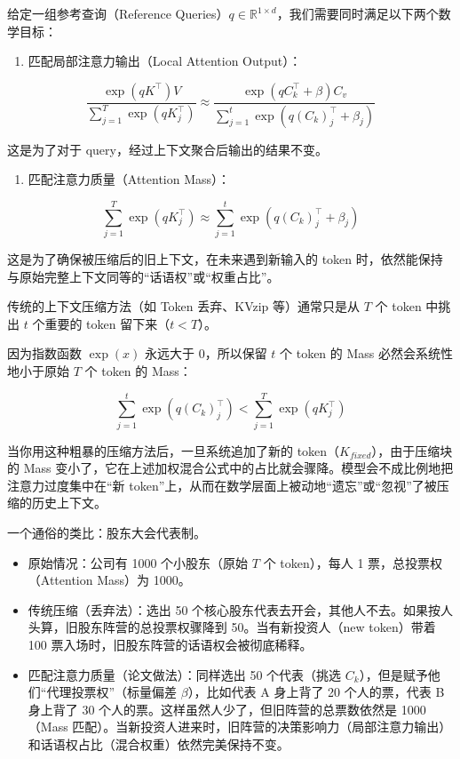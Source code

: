 给定一组参考查询（Reference Queries）\(q \in \mathbb{R}^{1 \times d}\)，我们需要同时满足以下两个数学目标：

\begin{enumerate}
\def\labelenumi{\arabic{enumi}.}
\tightlist
\item
  匹配局部注意力输出（Local Attention Output）：
\end{enumerate}

\[
\frac{\exp(qK^\top)V}{\sum_{j=1}^{T}\exp(qK_j^\top)}
\approx
\frac{\exp(qC_k^\top+\beta)C_v}{\sum_{j=1}^{t}\exp(q(C_k)_j^\top+\beta_j)}
\]

这是为了对于 query，经过上下文聚合后输出的结果不变。

\begin{enumerate}
\def\labelenumi{\arabic{enumi}.}
\setcounter{enumi}{1}
\tightlist
\item
  匹配注意力质量（Attention Mass）：
\end{enumerate}

\[
\sum_{j=1}^{T}\exp(qK_j^\top)
\approx
\sum_{j=1}^{t}\exp(q(C_k)_j^\top+\beta_j)
\]

这是为了确保被压缩后的旧上下文，在未来遇到新输入的 token 时，依然能保持与原始完整上下文同等的``话语权''或``权重占比''。

传统的上下文压缩方法（如 Token 丢弃、KVzip 等）通常只是从 \(T\) 个 token 中挑出 \(t\) 个重要的 token 留下来（\(t<T\)）。

因为指数函数 \(\exp(x)\) 永远大于 0，所以保留 \(t\) 个 token 的 Mass 必然会系统性地小于原始 \(T\) 个 token 的 Mass：

\[
\sum_{j=1}^{t}\exp(q(C_k)_j^\top)
<
\sum_{j=1}^{T}\exp(qK_j^\top)
\]

当你用这种粗暴的压缩方法后，一旦系统追加了新的 token（\(K_{fixed}\)），由于压缩块的 Mass 变小了，它在上述加权混合公式中的占比就会骤降。模型会不成比例地把注意力过度集中在``新 token''上，从而在数学层面上被动地``遗忘''或``忽视''了被压缩的历史上下文。

一个通俗的类比：股东大会代表制。

\begin{itemize}
\tightlist
\item
  原始情况：公司有 1000 个小股东（原始 \(T\) 个 token），每人 1 票，总投票权（Attention Mass）为 1000。
\item
  传统压缩（丢弃法）：选出 50 个核心股东代表去开会，其他人不去。如果按人头算，旧股东阵营的总投票权骤降到 50。当有新投资人（new token）带着 100 票入场时，旧股东阵营的话语权会被彻底稀释。
\item
  匹配注意力质量（论文做法）：同样选出 50 个代表（挑选 \(C_k\)），但是赋予他们``代理投票权''（标量偏差 \(\beta\)），比如代表 A 身上背了 20 个人的票，代表 B 身上背了 30 个人的票。这样虽然人少了，但旧阵营的总票数依然是 1000（Mass 匹配）。当新投资人进来时，旧阵营的决策影响力（局部注意力输出）和话语权占比（混合权重）依然完美保持不变。
\end{itemize}

